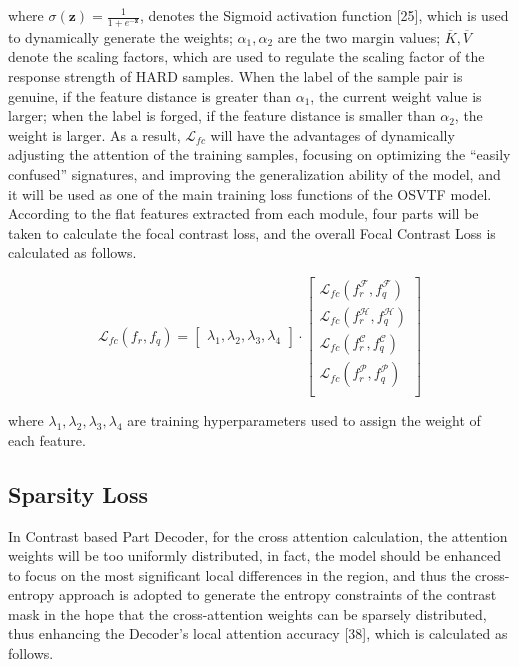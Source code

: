 where $\sigma(\boldsymbol{z})=\frac{1}{1+e^{-\boldsymbol{z}}}$, denotes the Sigmoid activation function [25], which is used to dynamically generate the weights; $\alpha_1,\alpha_2$ are the two margin values; $\overline{K},\overline{V}$ denote the scaling factors, which are used to regulate the scaling factor of the response strength of HARD samples. When the label of the sample pair is genuine, if the feature distance is greater than $\alpha_1$, the current weight value is larger; when the label is forged, if the feature distance is smaller than $\alpha_2$, the weight is larger. As a result, $\mathcal{L}_{fc}$ will have the advantages of dynamically adjusting the attention of the training samples, focusing on optimizing the “easily confused” signatures, and improving the generalization ability of the model, and it will be used as one of the main training loss functions of the OSVTF model. According to the flat features extracted from each module, four parts will be taken to calculate the focal contrast loss, and the overall Focal Contrast Loss is calculated as follows.

\begin{equation}
\label{eq18}
  \mathcal{L}_{fc}(f_r,f_q )=
  \begin{bmatrix}
  \lambda_1, \lambda_2, \lambda_3, \lambda_4
  \end{bmatrix} 
  \cdot
  \begin{bmatrix}
  \mathcal{L}_{fc} (f_r^\mathcal{F},f_q^\mathcal{F}) \\
  \mathcal{L}_{fc} (f_r^\mathcal{H},f_q^\mathcal{H}) \\
  \mathcal{L}_{fc} (f_r^\mathcal{C},f_q^\mathcal{C}) \\
  \mathcal{L}_{fc} (f_r^\mathcal{P},f_q^\mathcal{P}) \\
  \end{bmatrix}
\end{equation}

where $\lambda_1,\lambda_2,\lambda_3,\lambda_4$ are training hyperparameters used to assign the weight of each feature.

\newpage
\subsection{Sparsity Loss}

In Contrast based Part Decoder, for the cross attention calculation, the attention weights will be too uniformly distributed, in fact, the model should be enhanced to focus on the most significant local differences in the region, and thus the cross-entropy approach is adopted to generate the entropy constraints of the contrast mask in the hope that the cross-attention weights can be sparsely distributed, thus enhancing the Decoder's local attention accuracy [38], which is calculated as follows.

